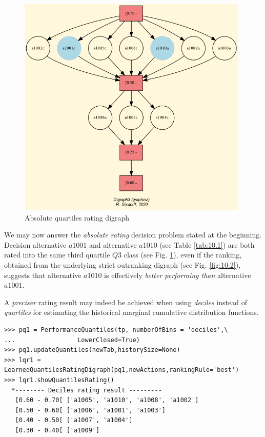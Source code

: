\begin{figure}[h]
  \includegraphics[width=11cm]{Figures/normedRatingDigraph.png}
\caption{Absolute quartiles rating digraph}
\label{fig:10.3}       %
\end{figure}

We may now answer the \emph{absolute rating} decision problem stated at the beginning. Decision alternative $a1001$ and alternative $a1010$ (see Table \ref{tab:10.1}) are both rated into the same third quartile $Q3$ class (see Fig. \ref{fig:10.3}), even if the \Copeland ranking, obtained from the underlying strict outranking digraph (see Fig. \ref{fig:10.2}), suggests that alternative $a1010$ is effectively \emph{better performing than} alternative $a1001$. 

A \emph{preciser} rating result may indeed be achieved when using \emph{deciles} instead of \emph{quartiles} for estimating the historical marginal cumulative distribution functions.

\begin{lstlisting}[caption={Absolute deciles rating result},label=list:10.9]
>>> pq1 = PerformanceQuantiles(tp, numberOfBins = 'deciles',\
...                 LowerClosed=True)
>>> pq1.updateQuantiles(newTab,historySize=None)
>>> lqr1 = LearnedQuantilesRatingDigraph(pq1,newActions,rankingRule='best')
>>> lqr1.showQuantilesRating()
  *-------- Deciles rating result ---------
   [0.60 - 0.70[ ['a1005', 'a1010', 'a1008', 'a1002']
   [0.50 - 0.60[ ['a1006', 'a1001', 'a1003']
   [0.40 - 0.50[ ['a1007', 'a1004']
   [0.30 - 0.40[ ['a1009']
\end{lstlisting}

